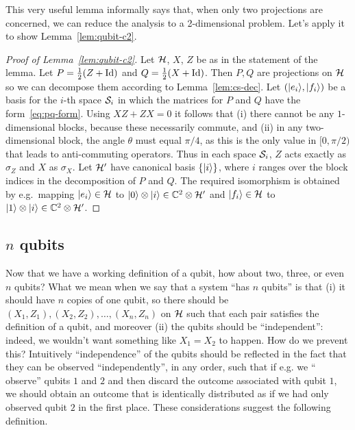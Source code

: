 This very useful lemma informally says that, when only two projections are concerned, we can reduce the analysis to a 2-dimensional problem. Let's apply it to show Lemma~\ref{lem:qubit-c2}. 


\begin{proof}[Proof of Lemma~\ref{lem:qubit-c2}]
Let $\mathcal{H}$, $X$, $Z$ be as in the statement of the lemma. Let $P=\frac{1}{2}(Z+\mathop{\rm Id}\nolimits)$ and $Q = \frac{1}{2}(X+\mathop{\rm Id}\nolimits)$. Then $P,Q$ are projections on $\mathcal{H}$ so we can decompose them according to Lemma~\ref{lem:cs-dec}. Let $(|e_i\rangle,|f_i\rangle)$ be a basis for the $i$-th space $\mathcal{S}_i$ in which the matrices for $P$ and $Q$ have the form~\eqref{eq:pq-form}. Using $XZ+ZX=0$ it follows that (i) there cannot be any $1$-dimensional blocks, because these necessarily commute, and (ii) in any two-dimensional block, the angle $\theta$ must equal $\pi/4$, as this is the only value in $[0,\pi/2)$ that leads to anti-commuting operators. Thus in each space $\mathcal{S}_i$, $Z$ acts exactly as $\sigma_Z$ and $X$ as $\sigma_X$. Let $\mathcal{H}'$ have canonical basis $\{|i\rangle\}$, where $i$ ranges over the block indices in the decomposition of $P$ and $Q$. The required isomorphism is obtained by e.g.\ mapping $|e_i\rangle\in \mathcal{H}$ to $|0\rangle \otimes |i\rangle\in \mathbb{C}^2 \otimes \mathcal{H}'$ and $|f_i\rangle\in\mathcal{H}$ to $|1\rangle\otimes |i\rangle\in\mathbb{C}^2\otimes\mathcal{H}'$. 
\end{proof}


\subsection{$n$ qubits}

Now that we have a working definition of a qubit, how about two, three, or even $n$ qubits? What we mean when we say that a system ``has $n$ qubits'' is that (i) it should have $n$ copies of one qubit, so there should be $(X_1,Z_1), (X_2,Z_2),\ldots,(X_n,Z_n)$ on $\mathcal{H}$ such that each pair satisfies the definition of a qubit, and moreover (ii) the qubits should be ``independent'': indeed, we wouldn't want something like $X_1=X_2$ to happen. How do we prevent this? Intuitively ``independence'' of the qubits should be reflected in the fact that they can be observed ``independently'', in any order, such that if e.g. we `` observe'' qubits $1$ and $2$ and then discard the outcome associated with qubit $1$, we should obtain an outcome that is identically distributed as if we had only observed qubit $2$ in the first place. These considerations suggest the following definition. 

